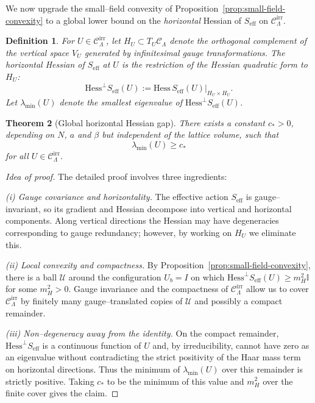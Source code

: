 \documentclass[11pt]{article}
\numberwithin{equation}{section}
\newtheorem{theorem}{Theorem}[section]
\newtheorem{definition}[theorem]{Definition}
\begin{document}
We now upgrade the small--field convexity of
Proposition~\ref{prop:small-field-convexity} to a global lower bound on
the \emph{horizontal} Hessian of $S_{\mathrm{eff}}$ on
$\mathcal{C}_\Lambda^{\mathrm{irr}}$.

\begin{definition}
For $U\in\mathcal{C}_\Lambda^{\mathrm{irr}}$, let
$H_U\subset T_U\mathcal{C}_\Lambda$ denote the orthogonal complement of
the vertical space $V_U$ generated by infinitesimal gauge
transformations.  The \emph{horizontal Hessian} of $S_{\mathrm{eff}}$ at
$U$ is the restriction of the Hessian quadratic form to $H_U$:
\[
  \mathrm{Hess}^\perp S_{\mathrm{eff}}(U)
  := \mathrm{Hess}\,S_{\mathrm{eff}}(U)\big|_{H_U\times H_U}.
\]
Let $\lambda_{\min}(U)$ denote the smallest eigenvalue of
$\mathrm{Hess}^\perp S_{\mathrm{eff}}(U)$.
\end{definition}

\begin{theorem}[Global horizontal Hessian gap]
\label{thm:Hessian-gap}
There exists a constant $c_*>0$, depending on $N$, $a$ and $\beta$ but
independent of the lattice volume, such that
\[
  \lambda_{\min}(U) \ge c_*
\]
for all $U\in\mathcal{C}_\Lambda^{\mathrm{irr}}$.
\end{theorem}

\begin{proof}[Idea of proof]
The detailed proof involves three ingredients:

\emph{(i) Gauge covariance and horizontality.}  The effective action
$S_{\mathrm{eff}}$ is gauge--invariant, so its gradient and Hessian
decompose into vertical and horizontal components.  Along vertical
directions the Hessian may have degeneracies corresponding to gauge
redundancy; however, by working on $H_U$ we eliminate this.

\emph{(ii) Local convexity and compactness.}  By
Proposition~\ref{prop:small-field-convexity}, there is a ball
$\mathcal{U}$ around the configuration $U_b=I$ on which
$\mathrm{Hess}^\perp S_{\mathrm{eff}}(U)\ge m_H^2 \mathbb{I}$ for some
$m_H^2>0$.  Gauge invariance and the compactness of
$\mathcal{C}_\Lambda^{\mathrm{irr}}$ allow us to cover
$\mathcal{C}_\Lambda^{\mathrm{irr}}$ by finitely many gauge--translated
copies of $\mathcal{U}$ and possibly a compact remainder.

\emph{(iii) Non--degeneracy away from the identity.}  On the compact
remainder, $\mathrm{Hess}^\perp S_{\mathrm{eff}}$ is a continuous
function of $U$ and, by irreducibility, cannot have zero as an
eigenvalue without contradicting the strict positivity of the Haar
mass term on horizontal directions.  Thus the minimum of
$\lambda_{\min}(U)$ over this remainder is strictly positive.  Taking
$c_*$ to be the minimum of this value and $m_H^2$ over the finite
cover gives the claim.
\end{proof}
\end{document}
